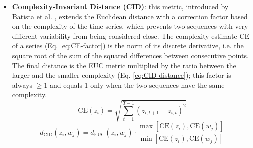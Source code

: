 \begin{itemize}
\begin{itemize}
        \item \textbf{Complexity-Invariant Distance (CID)}: this metric, introduced by Batista et al. \cite{Batista}, extends the Euclidean distance with a correction factor based on the complexity of the time series, which prevents two sequences with very different variability from being considered close. The complexity estimate $\mathrm{CE}$ of a series (Eq. \ref{eq:CE-factor}) is the norm of its discrete derivative, i.e. the square root of the sum of the squared differences between consecutive points. The final distance is the \ac{EUC} metric multiplied by the ratio between the larger and the smaller complexity (Eq. \ref{eq:CID-distance}); this factor is always $\geq 1$ and equals 1 only when the two sequences have the same complexity.
        \begin{equation}
            \label{eq:CE-factor}
            \mathrm{CE}(z_i) = \sqrt{\sum_{t=1}^{T-1} (z_{i, t+1} - z_{i, t})^2}
        \end{equation}
        \begin{equation}
            \label{eq:CID-distance}
            d_\text{CID}(z_i, w_j) = d_\text{EUC}(z_i, w_j) \cdot \frac{\max[\mathrm{CE}(z_i), \mathrm{CE}(w_j)]}{\min[\mathrm{CE}(z_i), \mathrm{CE}(w_j)]}
        \end{equation}


\end{itemize}
\end{itemize}
